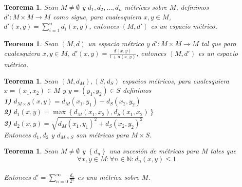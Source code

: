 \documentclass[oneside]{book} %
\theoremstyle{Teorema}
\newtheorem{Teorema}[Definicion]{Teorema}
\theoremstyle{Ejemplos}
\theoremstyle{[Obs]}
\renewcommand{\{}{\left\lbrace} %
\renewcommand{\}}{\right\rbrace} %
\begin{document}
			\begin{Teorema}
				
				Sean $M \neq \emptyset$ y $d_1, d_2, ..., d_n$ métricas sobre $M$, definimos $d' : M \times M \to M$ como sigue, para cualesquiera $x, y \in M$, $d'(x, y) = \displaystyle\sum_{i = 1}^{n} d_i(x, y)$, entonces $(M, d')$ es un espacio métrico. \\

			\end{Teorema}

			\begin{Teorema}
				
				Sean $(M, d)$ un espacio métrico y $d' : M \times M \to M$ tal que para cualesquiera $x, y \in M$, $d'(x, y) = \frac{d(x,y)}{1 + d(x, y)}$, entonces $(M, d')$ es un espacio métrico. \\

			\end{Teorema}

			\begin{Teorema}
				
				Sean $(M, d_M), (S, d_S)$ espacios métricos, para cualesquiera $x = (x_1, x_2) \in M$ y $y = (y_1, y_2) \in S$ definimos \\

				\textbf{1)} $d_{M \times S}(x, y) = d_M(x_1, y_1) + d_S(x_2, y_2)$ \\

				\textbf{2)} $d_1(x, y) = \max\{ d_M(x_1, x_2), d_S(x_1, x_2) \}$ \\

				\textbf{3)} $d_2(x, y) = \sqrt{d_M(x_1, y_1)^2 + d_S(x_2, y_2)^2}$ \\

				Entonces $d_1, d_2$ y $d_{M \times S}$ son métricas para $M \times S$. \\

			\end{Teorema}

			\begin{Teorema}
				
				Sean $M \neq \emptyset$ y $\{ d_n \}$ una sucesión de métricas para $M$ tales que \\

				\[ \forall x, y \in M : \forall n \in \mathbb{N} : d_n(x, y) \leq 1 \] \\

				Entonces $d' = \displaystyle\sum_{n = 0}^{\infty} \frac{d_n}{2^n}$ es una métrica sobre $M$. \\

			\end{Teorema}
\end{document}
